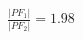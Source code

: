 \documentclass[preview]{standalone}
\begin{document}
\begin{align*}
\frac{|PF_1|}{|PF_2|} = 1.98
\end{align*}
\end{document}
